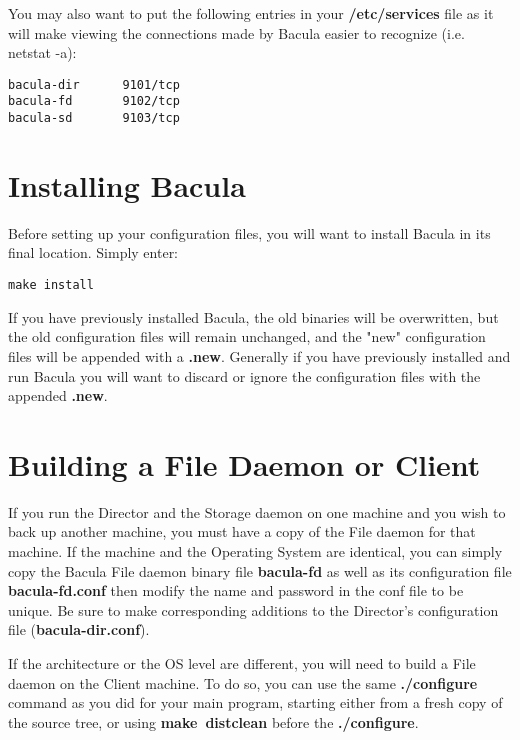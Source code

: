 You may also want to put the following entries in your {\bf /etc/services}
file as it will make viewing the connections made by Bacula easier to
recognize (i.e. netstat -a): 

\footnotesize
\begin{verbatim}
bacula-dir      9101/tcp
bacula-fd       9102/tcp
bacula-sd       9103/tcp
\end{verbatim}
\normalsize

\section{Installing Bacula}

Before setting up your configuration files, you will want to install Bacula in
its final location. Simply enter: 

\footnotesize
\begin{verbatim}
make install
\end{verbatim}
\normalsize

If you have previously installed Bacula, the old binaries will be overwritten,
but the old configuration files will remain unchanged, and the "new"
configuration files will be appended with a {\bf .new}. Generally if you have
previously installed and run Bacula you will want to discard or ignore the
configuration files with the appended {\bf .new}. 

\section{Building a File Daemon or Client}

If you run the Director and the Storage daemon on one machine and you wish to
back up another machine, you must have a copy of the File daemon for that
machine. If the machine and the Operating System are identical, you can simply
copy the Bacula File daemon binary file {\bf bacula-fd} as well as its
configuration file {\bf bacula-fd.conf} then modify the name and password in
the conf file to be unique. Be sure to make corresponding additions to the
Director's configuration file ({\bf bacula-dir.conf}). 

If the architecture or the OS level are different, you will need to build a
File daemon on the Client machine. To do so, you can use the same {\bf
./configure} command as you did for your main program, starting either from a
fresh copy of the source tree, or using {\bf make\ distclean} before the {\bf
./configure}. 

